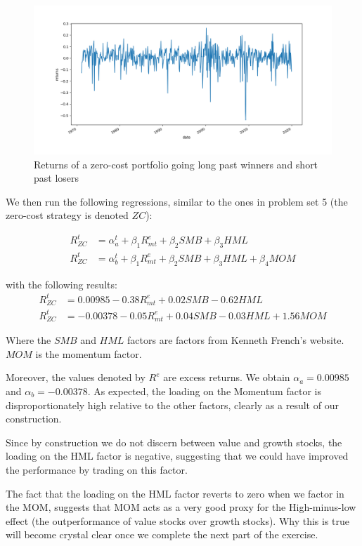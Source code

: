 \documentclass[10pt]{article}
\begin{document}
\begin{figure}[h]
    \centering
    \includegraphics[scale=0.5]{ps8_ex2_plot1.png}
    \caption{Returns of a zero-cost portfolio going long past winners and short past losers}
    \label{ps8_ex2_plot1}    
\end{figure}

We then run the following regressions, similar to the ones in problem set 5 (the zero-cost strategy is denoted $ZC$):

\begin{align*}	
	R^t_{ZC} &= \alpha^t_a +  \beta_1 R^e_{mt} + \beta_2 SMB + \beta_3 HML \\
	R^t_{ZC}  &= \alpha^t_b + \beta_1 R^e_{mt} + \beta_2 SMB + \beta_3 HML + \beta_4 MOM
\end{align*}  

with the following results:
\begin{align*}	
	R^t_{ZC} &= 0.00985 - 0.38 R^e_{mt} + 0.02 SMB -0.62 HML \\
	R^t_{ZC}  &= -0.00378 -0.05 R^e_{mt} + 0.04 SMB -0.03 HML + 1.56 MOM
\end{align*}  

Where the $SMB$ and $HML$ factors are factors from Kenneth French’s website.
$MOM$ is the momentum factor.

Moreover, the values denoted by $R^e$ are excess returns. We obtain $\alpha_{a} = 0.00985$ and $\alpha_{b} = -0.00378$.   
As expected, the loading on the Momentum factor is disproportionately high
relative to the other factors, clearly as a result of our construction.

Since by construction we do not discern between value and growth stocks, the
loading on the HML factor is negative, suggesting that we could have improved
the performance by trading on this factor.

The fact
that the loading on the HML factor reverts to zero when we factor in the MOM,
suggests that MOM acts as a very good proxy for the High-minus-low effect (the
outperformance of value stocks over growth stocks). Why
this is true will become crystal clear once we complete the next part of the exercise.
   
\end{document}
